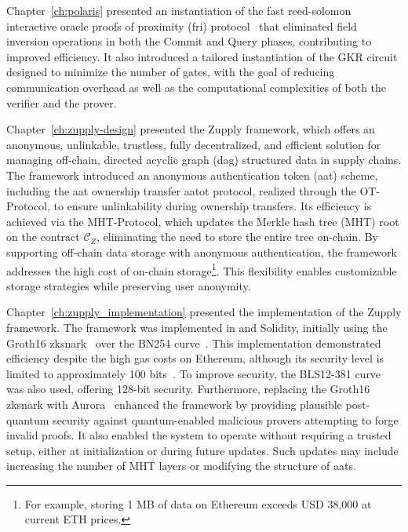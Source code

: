 Chapter~\ref{ch:polaris} presented an instantiation of the fast reed-solomon interactive oracle proofs of proximity (\gls{fri}) protocol~\cite{FRI2018} that eliminated field inversion operations in both the Commit and Query phases, contributing to improved efficiency. It also introduced a tailored instantiation of the GKR circuit designed to minimize the number of gates, with the goal of reducing communication overhead as well as the computational complexities of both the verifier and the prover.

Chapter~\ref{ch:zupply-design} presented the Zupply framework, which offers an anonymous, unlinkable, trustless, fully decentralized, and efficient solution for managing off-chain, directed acyclic graph (\gls{dag}) structured data in supply chains. The framework introduced an anonymous authentication token (\gls{aat}) scheme, including the \gls{aat} ownership transfer \gls{aatot} protocol, realized through the \textsf{OT-Protocol}, to ensure unlinkability during ownership transfers. Its efficiency is achieved via the \textsf{MHT-Protocol}, which updates the Merkle hash tree (\textsf{MHT}) root on the contract $\mathcal{C}_Z$, eliminating the need to store the entire tree on-chain. By supporting off-chain data storage with anonymous authentication, the framework addresses the high cost of on-chain storage\footnote{For example, storing 1 MB of data on Ethereum exceeds USD 38,000 at current ETH prices.}. This flexibility enables customizable storage strategies while preserving user anonymity.

Chapter~\ref{ch:zupply_implementation} presented the implementation of the Zupply framework. The framework was implemented in \CC and Solidity, initially using the Groth16 \gls{zksnark}~\cite{Groth2016} over the BN254 curve~\cite{BNcurve}. This implementation demonstrated efficiency despite the high gas costs on Ethereum, although its security level is limited to approximately 100 bits~\cite{Barbulescu2019}. To improve security, the BLS12-381 curve~\cite{BLS_curve2003} was also used, offering 128-bit security. Furthermore, replacing the Groth16 \gls{zksnark} with Aurora~\cite{Aurora2019} enhanced the framework by providing plausible post-quantum security against quantum-enabled malicious provers attempting to forge invalid proofs. It also enabled the system to operate without requiring a trusted setup, either at initialization or during future updates. Such updates may include increasing the number of \textsf{MHT} layers or modifying the structure of \glspl{aat}.







